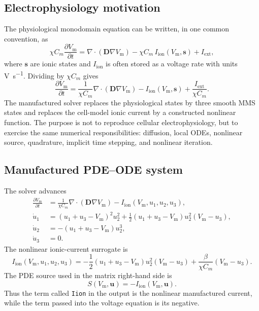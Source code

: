 \documentclass[11pt,a4paper]{article}
\newcommand{\code}[1]{\texttt{\small #1}}
\newcommand{\Vm}{V_{\text{m}}}
\newcommand{\Iion}{I_{\mathrm{ion}}}
\newcommand{\Dten}{\mathbf{D}}
\newcommand{\grad}{\nabla}
\newcommand{\divg}{\nabla\!\cdot}
\begin{document}
\subsection{Electrophysiology motivation}

The physiological monodomain equation can be written, in one common convention,
as
\begin{equation}
  \chi C_m \frac{\partial \Vm}{\partial t}
  =
  \divg(\Dten \grad \Vm)
  - \chi C_m\,\Iion(\Vm,\mathbf{s})
  + I_{\mathrm{ext}},
  \label{eq:phys-monodomain}
\end{equation}
where $\mathbf{s}$ are ionic states and $\Iion$ is often stored as a voltage
rate with units \si{\volt\per\second}. Dividing by $\chi C_m$ gives
\begin{equation}
  \frac{\partial \Vm}{\partial t}
  =
  \frac{1}{\chi C_m}\divg(\Dten\grad\Vm)
  - \Iion(\Vm,\mathbf{s})
  + \frac{I_{\mathrm{ext}}}{\chi C_m}.
\end{equation}
The manufactured solver replaces the physiological states by three smooth MMS
states and replaces the cell-model ionic current by a constructed nonlinear
function. The purpose is not to reproduce cellular electrophysiology, but to
exercise the same numerical responsibilities: diffusion, local ODEs, nonlinear
source, quadrature, implicit time stepping, and nonlinear iteration.

\subsection{Manufactured PDE--ODE system}

The solver advances
\begin{align}
  \frac{\partial \Vm}{\partial t}
  &=
  \frac{1}{\chi C_m}\divg(\Dten\grad\Vm)
  - \Iion(\Vm,u_1,u_2,u_3),
  \label{eq:mms-pde}\\
  \dot u_1
  &=
  (u_1+u_3-\Vm)^2 u_2^2
  + \frac{1}{2}(u_1+u_3-\Vm)u_2^2(\Vm-u_3),
  \label{eq:mms-u1}\\
  \dot u_2
  &=
  -(u_1+u_3-\Vm)u_2^3,
  \label{eq:mms-u2}\\
  \dot u_3 &= 0.
  \label{eq:mms-u3}
\end{align}
The nonlinear ionic-current surrogate is
\begin{equation}
  \Iion(\Vm,u_1,u_2,u_3)
  =
  -\frac{1}{2}(u_1+u_3-\Vm)u_2^2(\Vm-u_3)
  + \frac{\beta}{\chi C_m}(\Vm-u_3).
  \label{eq:mms-iion}
\end{equation}
The PDE source used in the matrix right-hand side is
\begin{equation}
  S(\Vm,\mathbf{u})=-\Iion(\Vm,\mathbf{u}).
  \label{eq:mms-source}
\end{equation}
Thus the term called \code{Iion} in the output is the nonlinear manufactured
current, while the term passed into the voltage equation is its negative.
\end{document}
